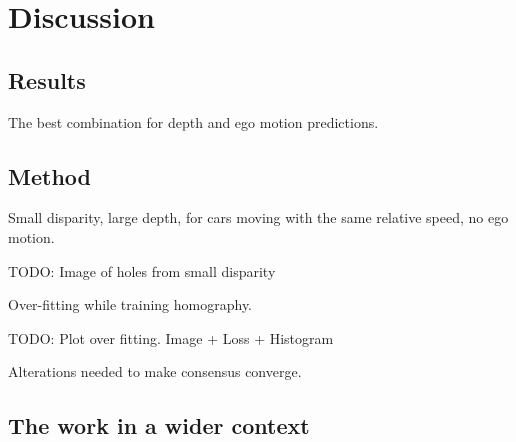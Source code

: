 \chapter{Discussion}\label{cha:discussion}

\section{Results}
The best combination for depth and ego motion predictions.

\section{Method}

Small disparity, large depth, for cars moving with the same relative speed, no ego motion.

TODO: Image of holes from small disparity

Over-fitting while training homography.

TODO: Plot over fitting. Image + Loss + Histogram

Alterations needed to make consensus converge.

\section{The work in a wider context}